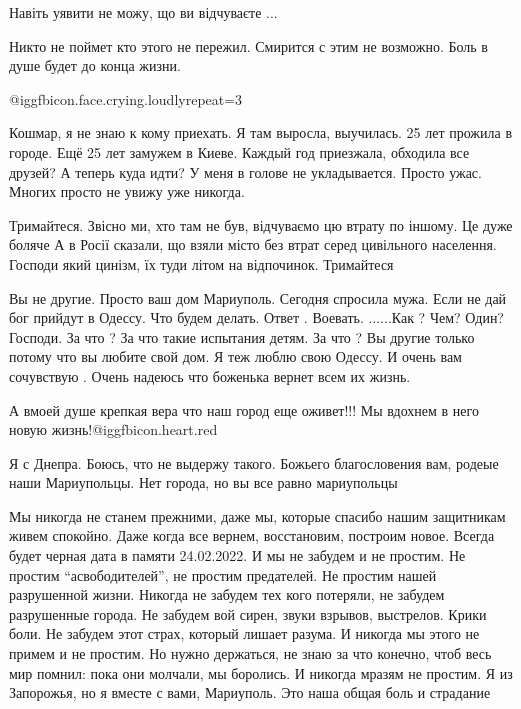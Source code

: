 \begin{itemize}
Навіть уявити не можу, що ви відчуваєте ...


Никто не поймет кто этого не пережил. Смирится с этим не возможно. Боль в душе
будет до конца жизни.

 @igg{fbicon.face.crying.loudly}{repeat=3} 


Кошмар, я не знаю к кому приехать. Я там выросла, выучилась. 25 лет прожила в
городе. Ещё 25 лет замужем в Киеве. Каждый год приезжала, обходила все друзей?
А теперь куда идти? У меня в голове не укладывается. Просто ужас. Многих просто
не увижу уже никогда.


Тримайтеся. Звісно ми, хто там не був, відчуваємо цю втрату по іншому. Це дуже
боляче А в Росії сказали, що взяли місто без втрат серед цивільного населення.
Господи який цинізм, їх туди літом на відпочинок. Тримайтеся


Вы не другие. Просто ваш дом Мариуполь. Сегодня спросила мужа. Если не дай бог
прийдут в Одессу. Что будем делать. Ответ . Воевать. ......Как ? Чем? Один?
Господи. За что ? За что такие испытания детям. За что ? Вы другие только
потому что вы любите свой дом. Я теж люблю свою Одессу. И очень вам сочувствую
. Очень надеюсь что боженька вернет всем их жизнь.


А вмоей душе крепкая вера что наш город еще оживет!!! Мы вдохнем в него новую
жизнь!@igg{fbicon.heart.red}


Я с Днепра. Боюсь, что не выдержу такого. Божьего благословения вам, родеые
наши Мариупольцы. Нет города, но вы все равно мариупольцы


Мы никогда не станем прежними, даже мы, которые спасибо нашим защитникам живем
спокойно. Даже когда все вернем, восстановим, построим новое. Всегда будет
черная дата в памяти 24.02.2022. И мы не забудем и не простим. Не простим
\enquote{асвободителей}, не простим предателей. Не простим нашей разрушенной
жизни.  Никогда не забудем тех кого потеряли, не забудем разрушенные города. Не
забудем вой сирен, звуки взрывов, выстрелов. Крики боли. Не забудем этот страх,
который лишает разума. И никогда мы этого не примем и не простим. Но нужно
держаться, не знаю за что конечно, чтоб весь мир помнил: пока они молчали, мы
боролись. И никогда мразям не простим.  Я из Запорожья, но я вместе с вами,
Мариуполь. Это наша общая боль и страдание


\end{itemize}

